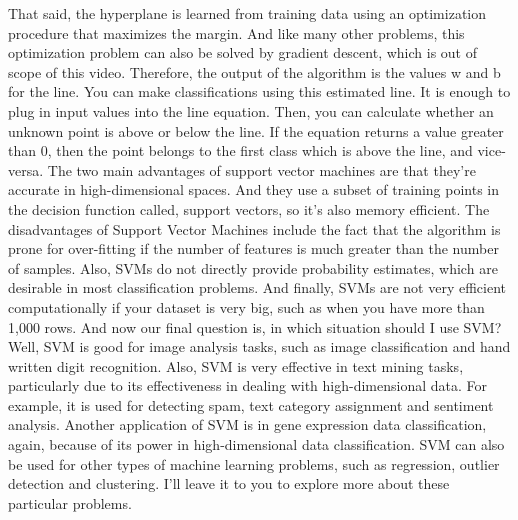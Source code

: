 	That said, the hyperplane is learned from training data using an optimization procedure that maximizes the margin. And like many other problems, this optimization problem can also be solved by gradient descent, which is out of scope of this video. Therefore, the output of the algorithm is the values w and b for the line. You can make classifications using this estimated line. It is enough to plug in input values into the line equation. Then, you can calculate whether an unknown point is above or below the line. If the equation returns a value greater than 0, then the point belongs to the first class which is above the line, and vice-versa. The two main advantages of support vector machines are that they're accurate in high-dimensional spaces. And they use a subset of training points in the decision function called, support vectors, so it's also memory efficient. The disadvantages of Support Vector Machines include the fact that the algorithm is prone for over-fitting if the number of features is much greater than the number of samples. Also, SVMs do not directly provide probability estimates, which are desirable in most classification problems. And finally, SVMs are not very efficient computationally if your dataset is very big, such as when you have more than 1,000 rows. And now our final question is, in which situation should I use SVM? Well, SVM is good for image analysis tasks, such as image classification and hand written digit recognition. Also, SVM is very effective in text mining tasks, particularly due to its effectiveness in dealing with high-dimensional data. For example, it is used for detecting spam, text category assignment and sentiment analysis. Another application of SVM is in gene expression data classification, again, because of its power in high-dimensional data classification. SVM can also be used for other types of machine learning problems, such as regression, outlier detection and clustering. I'll leave it to you to explore more about these particular problems.
	